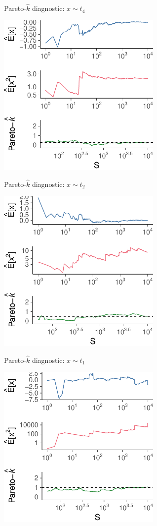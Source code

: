\documentclass[english,t]{beamer}
\begin{document}
\begin{frame}{Pareto-$\hat{k}$ diagnostic: $x \sim t_4$}

  \includegraphics[width=8cm]{k2c.pdf}

\end{frame}

\begin{frame}{Pareto-$\hat{k}$ diagnostic: $x \sim t_2$}

  \includegraphics[width=8cm]{k3c.pdf}

\end{frame}

\begin{frame}{Pareto-$\hat{k}$ diagnostic: $x \sim t_1$}

  \includegraphics[width=8cm]{k4c.pdf}

\end{frame}
\end{document}
